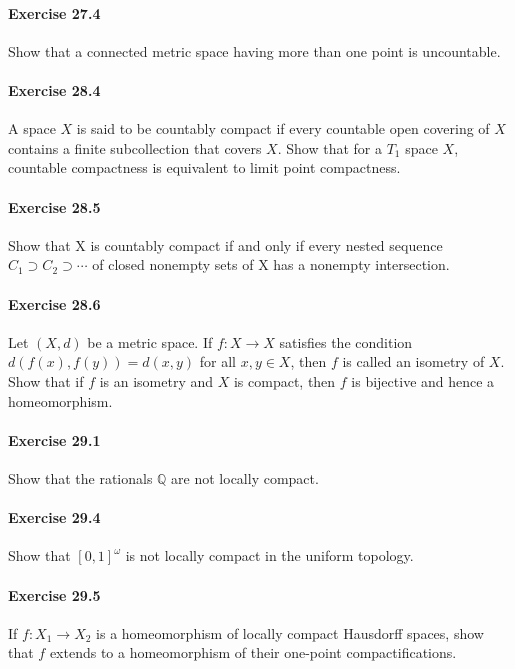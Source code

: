 \documentclass{article}
\begin{document}
\paragraph{Exercise 27.4} Show that a connected metric space having more than one point is uncountable.

\paragraph{Exercise 28.4} A space $X$ is said to be countably compact if every countable open covering of $X$ contains a finite subcollection that covers $X$. Show that for a $T_1$ space $X$, countable compactness is equivalent to limit point compactness.

\paragraph{Exercise 28.5} Show that X is countably compact if and only if every
nested sequence $C_1 \supset C_2 \supset \cdots$ of closed nonempty sets of X has a nonempty intersection.

\paragraph{Exercise 28.6} Let $(X, d)$ be a metric space. If $f: X \rightarrow X$ satisfies the condition $d(f(x), f(y))=d(x, y)$ for all $x, y \in X$, then $f$ is called an isometry of $X$. Show that if $f$ is an isometry and $X$ is compact, then $f$ is bijective and hence a homeomorphism.

\paragraph{Exercise 29.1} Show that the rationals $\mathbb{Q}$ are not locally compact.

\paragraph{Exercise 29.4} Show that $[0, 1]^\omega$ is not locally compact in the uniform topology.

\paragraph{Exercise 29.5} If $f \colon X_1 \rightarrow X_2$ is a homeomorphism of locally compact Hausdorff spaces, show that $f$ extends to a homeomorphism of their one-point compactifications.
\end{document}
